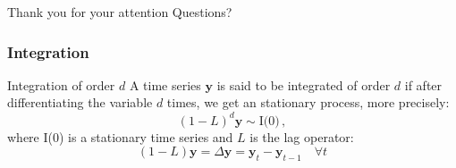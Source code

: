 \documentclass{beamer}
\begin{document}
\begin{frame}[plain,c]
\begin{center}
\Huge Thank you for your attention
\Huge Questions?
\end{center}
\end{frame}

%






\begin{frame}
\frametitle{Integration }
\begin{block}{Integration of order $d$}
A time series $\mathbf{y}$ is said to be integrated of order $d$ if after
differentiating the variable $d$ times, we get an stationary process, more precisely:
\[
(1-L)^d \mathbf{y} \sim \text{I(0)} \, ,
\]
\noindent where I(0) is a stationary time series and $L$ is the lag operator:
\[
(1-L)\mathbf{y} = \Delta \mathbf{y}=\mathbf{y}_t  -\mathbf{y}_{t-1} \quad \forall t
\]
\end{block}
\end{frame}
\end{document}
